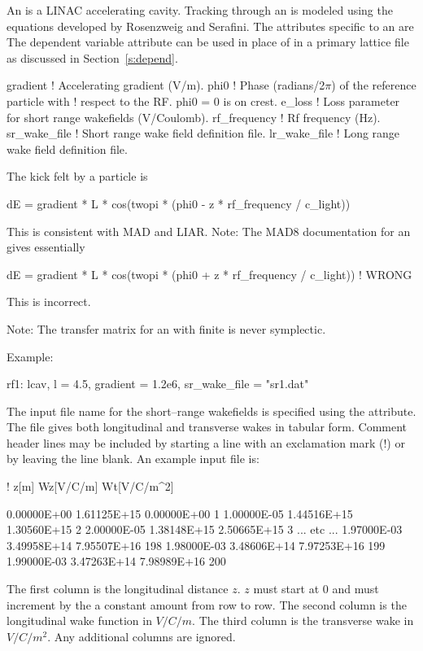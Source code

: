 {{An  is a LINAC accelerating cavity.
Tracking through an  is modeled using the equations
developed by Rosenzweig and Serafini\cite{b:rosenzweig}. The
attributes specific to an  are The dependent variable
 attribute can be used in place of  in a
primary lattice file as discussed in Section~\ref{s:depend}.
\begin{example}
  gradient     ! Accelerating gradient (V/m).
  phi0         ! Phase (radians/2\(\pi\)) of the reference particle with 
               !   respect to the RF. phi0 = 0 is on crest.
  e_loss       ! Loss parameter for short range wakefields (V/Coulomb).
  rf_frequency ! Rf frequency (Hz).
  sr_wake_file ! Short range wake field definition file.
  lr_wake_file ! Long range wake field definition file.
\end{example}

The kick felt by a particle is 
\begin{example}
  dE = gradient * L * cos(twopi * (phi0 - z * rf_frequency / c_light))
\end{example}
This is consistent with MAD and LIAR. Note: The MAD8 documentation 
for an  gives essentially
\begin{example}
  dE = gradient * L * cos(twopi * (phi0 + z * rf_frequency / c_light)) ! WRONG
\end{example}
This is incorrect.

Note: The transfer matrix for an  with finite
 is never symplectic.

Example:
\begin{example}
  rf1: lcav, l = 4.5, gradient = 1.2e6, sr\_wake\_file = "sr1.dat"
\end{example}

The input file name for the short--range wakefields is specified using the 
 attribute. The file gives both longitudinal and transverse wakes in 
tabular form. Comment header lines may be included by starting a line
with an exclamation mark (!) or by leaving the line blank. 
An example input file is:
\begin{example}
!    z[m]       Wz[V/C/m]   Wt[V/C/m^2]

 0.00000E+00  1.61125E+15   0.00000E+00     1 
 1.00000E-05  1.44516E+15   1.30560E+15     2 
 2.00000E-05  1.38148E+15   2.50665E+15     3 
 ... etc ...
 1.97000E-03  3.49958E+14   7.95507E+16   198 
 1.98000E-03  3.48606E+14   7.97253E+16   199 
 1.99000E-03  3.47263E+14   7.98989E+16   200 
\end{example}
The first column is the longitudinal distance $z$. $z$ must start at 0 and must increment by
the a constant amount from row to row. The second column is the longitudinal wake function in
$V/C/m$. The third column is the transverse wake in $V/C/m^2$. Any additional columns are ignored.

}}
